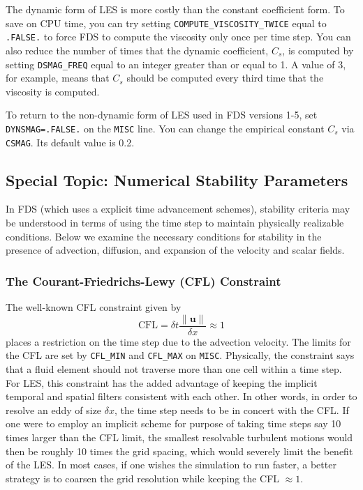 \documentclass[11pt]{book}
\newcommand{\ct}{\tt\small}
\begin{document}
The dynamic form of LES is more costly than the constant coefficient form. To save on CPU time, you can try setting {\ct COMPUTE\_VISCOSITY\_TWICE} equal to {\ct .FALSE.} to force FDS to compute the viscosity only once per time step. You can also reduce the number of times that the dynamic coefficient, $C_s$, is computed by setting {\ct DSMAG\_FREQ} equal to an integer greater than or equal to 1. A value of 3, for example, means that $C_s$ should be computed every third time that the viscosity is computed.

\begin{warning}
\noindent
To return to the non-dynamic form of LES used in FDS versions 1-5, set {\ct DYNSMAG=.FALSE.} on the {\ct MISC} line. You can change
the empirical constant $C_s$ via {\ct CSMAG}. Its default value is 0.2.
\end{warning}


\subsection{Special Topic: Numerical Stability Parameters}
\label{info:CFL}

In FDS (which uses a explicit time advancement schemes), stability criteria may be understood in terms of using the time step to maintain physically realizable conditions.  Below we examine the necessary conditions for stability in the presence of advection, diffusion, and expansion of the velocity and scalar fields.

\subsubsection{The Courant-Friedrichs-Lewy (CFL) Constraint}

The well-known CFL constraint given by
\begin{equation}
\mbox{CFL} = \delta t \frac{\|\mathbf{u}\|}{\delta x} \approx 1
\end{equation}
places a restriction on the time step due to the advection velocity.  The limits for the CFL are set by {\ct CFL\_MIN} and {\ct CFL\_MAX} on {\ct MISC}. Physically, the constraint says that a fluid element should not traverse more than one cell within a time step. For LES, this constraint has the added advantage of keeping the implicit temporal and spatial filters consistent with each other.  In other words, in order to resolve an eddy of size $\delta x$, the time step needs to be in concert with the CFL.  If one were to employ an implicit scheme for purpose of taking time steps say 10 times larger than the CFL limit, the smallest resolvable turbulent motions would then be roughly 10 times the grid spacing, which would severely limit the benefit of the LES.  In most cases, if one wishes the simulation to run faster, a better strategy is to coarsen the grid resolution while keeping the CFL $\approx 1$.
\end{document}
